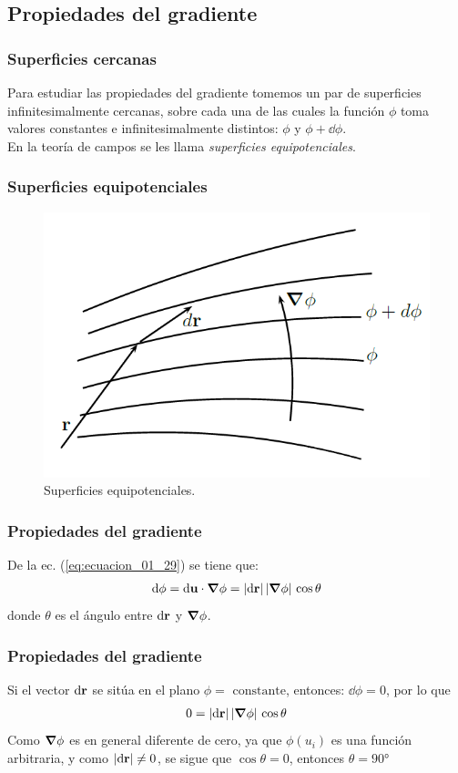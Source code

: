 \documentclass[12pt]{beamer}
\begin{document}
\subsection{Propiedades del gradiente}
\begin{frame}
\frametitle{Superficies cercanas}
Para estudiar las propiedades del gradiente tomemos un par de superficies infinitesimalmente cercanas, sobre cada una de las cuales la función $\phi$ toma valores constantes e infinitesimalmente distintos: $\phi$ y $\phi + \dd{\phi}$.
\\
\bigskip
\pause
En la teoría de campos se les llama \emph{superficies equipotenciales}.
\end{frame}
\begin{frame}
\frametitle{Superficies equipotenciales}
\begin{figure}[h!]
    \centering
    \includegraphics[scale=0.5]{Imagenes/Superficies_Equipotenciales.png}
    \caption{Superficies equipotenciales.}
    \label{fig:Superficies_Equipotenciales}
\end{figure}
\end{frame}
\begin{frame}
\frametitle{Propiedades del gradiente}
De la ec. (\ref{eq:ecuacion_01_29}) se tiene que:
\begin{align*}
\dd{\phi} = \dd{\vb{u}} \cdot \grad{\phi} = \abs{\dd{\vb{r}}} \, \abs{\grad{\phi}} \, \cos \theta
\end{align*}
donde $\theta$ es el ángulo entre $\dd{\vb{r}}$ y $\grad{\phi}$.
\end{frame}
\begin{frame}
\frametitle{Propiedades del gradiente}
Si el vector $\dd{\vb{r}}$ se sitúa en el plano $\phi = \mbox{ constante}$, entonces: $\dd{\phi} = 0$, por lo que
\begin{align*}
0 = \abs{\dd{\vb{r}}} \, \abs{\grad{\phi}} \, \cos \theta
\end{align*}
\pause
Como $\grad{\phi}$ es en general diferente de cero, ya que $\phi(u_{i})$ es una función arbitraria, y como $\abs{\dd{\vb{r}}} \neq 0$, se sigue que $\cos \theta = 0$, entonces $\theta = \ang{90}$
\end{frame}
\end{document}
